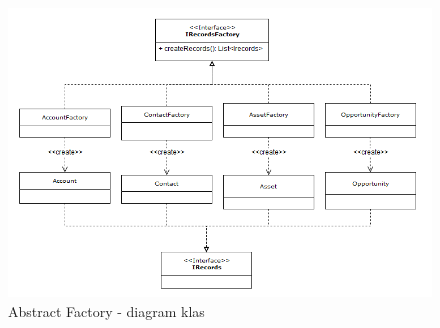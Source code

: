 \documentclass[a4paper,11pt]{article}
\begin{document}
\begin{enumerate}[leftmargin=0pt]
\begin{itemize}
	
	\begin{figure}[!htb]
	        \centerline{\includegraphics[scale=1]{abstractfactory.png}}
	        \caption{{\footnotesize Abstract Factory - diagram klas}}
    \end{figure}


	\end{itemize}
	
	

	
	
	\newpage
	


	
\end{enumerate}
\end{document}

